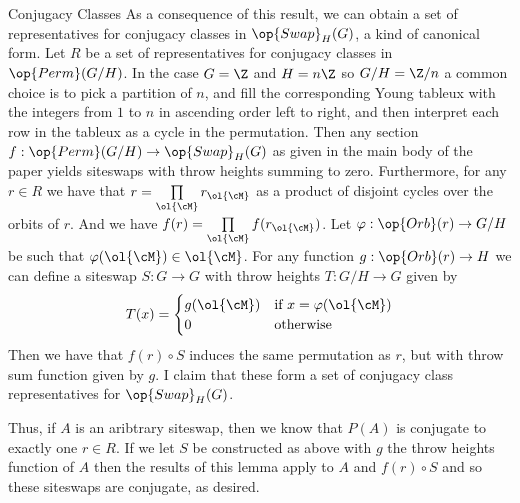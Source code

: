 \documentclass[12nt]{article}
\theoremstyle{plain}
\begin{document}
\begin{subsection}{Conjugacy Classes}
As a consequence of this result, we can obtain a set of representatives for conjugacy classes in $\op{Swap}_H(G)$, a kind of canonical form. Let $R$ be a set of representatives for conjugacy classes in $\op{Perm}(G/H)$. In the case $G = \Z$ and $H = n\Z$ so $G/H = \Z/n$ a common choice is to pick a partition of $n$, and fill the corresponding Young tableux with the integers from $1$ to $n$ in ascending order left to right, and then interpret each row in the tableux as a cycle in the permutation. 
Then any section $f : \op{Perm}(G/H) \to \op{Swap}_H(G)$ as given in the main body of the paper yields siteswaps with throw heights summing to zero. Furthermore, for any $r \in R$ we have that $r = \prod \limits_{\ol{\cM}} r_{\ol{\cM}}$ as a product of disjoint cycles over the orbits of $r$. And we have $f(r) = \prod \limits_{\ol{\cM}} f(r_{\ol{\cM}})$. Let $\varphi : \op{Orb}(r) \to G/H$ be such that $\varphi(\ol{\cM}) \in \ol{\cM}$. For any function $g : \op{Orb}(r) \to H$ we can define a siteswap $S : G \to G$ with throw heights $T : G/H \to G$ given by 
\[
	T(x) = \begin{cases}
		g(\ol{\cM}) & \text{if } x = \varphi(\ol{\cM}) \\
		0 & \text{otherwise}
	\end{cases}
\]
Then we have that $f(r) \circ S$ induces the same permutation as $r$, but with throw sum function given by $g$. I claim that these form a set of conjugacy class representatives for $\op{Swap}_H(G)$.

Thus, if $A$ is an aribtrary siteswap, then we know that $P(A)$ is conjugate to exactly one $r \in R$. If we let $S$ be constructed as above with $g$ the throw heights function of $A$ then the results of this lemma apply to $A$ and $f(r) \circ S$ and so these siteswaps are conjugate, as desired.

\end{subsection}
\end{document}
